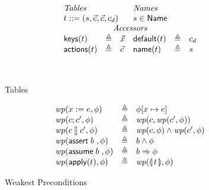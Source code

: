 \begin{figure}[ht]
  \[\begin{array}{l >{\triangleq}c l l >{\triangleq}c l}
      \multicolumn 3 l {\textit{Tables}}  & \multicolumn 3 l {\textit{Names}}\\
      \multicolumn 3 l {t::= (s,\vec e, \vec c, c_d)} & \multicolumn 3 l {s \in \Name}\\
      \multicolumn 6 c {\textit{Accessors}}\\
      \keys t && \vec x &  \default t && c_d \\
      \actions t && \vec c & \name t && s \\\\
 \\
      
    \end{array}\]

  \caption{Tables}
  \label{fig:tables}
\end{figure}

\begin{figure}[ht]
  \[\begin{array}{l >{\triangleq}c l}
      \wp(x:=e, \phi) && \phi[x \mapsto e]\\
      \wp(c;c', \phi) && \wp(c, \wp(c', \phi)) \\
      \wp(c\angel c', \phi) && \wp(c, \phi) \wedge \wp(c',\phi) \\
      \wp(\assert b, \phi) && b \wedge \phi \\
      \wp(\assume b, \phi) && b \Rightarrow \phi \\
      \wp(\apply t, \phi) && \wp(\parenbb t, \phi) \\
    \end{array}\]
  \caption{Weakest Preconditions}
  \label{fig:wp}
\end{figure}

  

